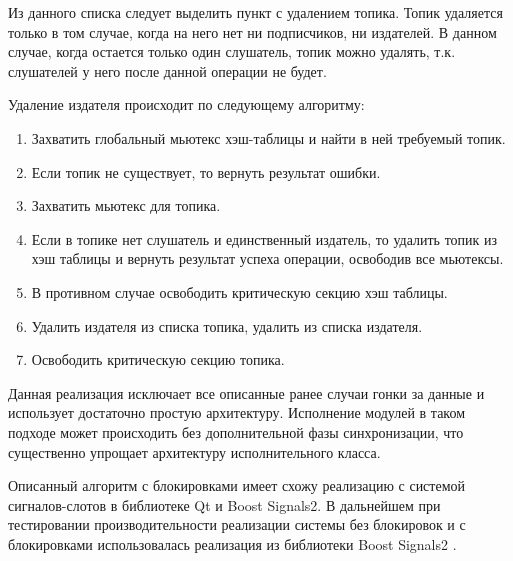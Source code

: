 Из данного списка следует выделить пункт с удалением топика. Топик удаляется только в том случае, когда на него нет ни подписчиков, ни издателей. В данном случае, когда остается только один слушатель, топик можно удалять, т.к. слушателей у него после данной операции не будет.

Удаление издателя происходит по следующему алгоритму:

\begin{enumerate}
	\item Захватить глобальный мьютекс хэш-таблицы и найти в ней требуемый топик.
	\item Если топик не существует, то вернуть результат ошибки.
	\item Захватить мьютекс для топика.
	\item Если в топике нет слушатель и единственный издатель, то удалить топик из хэш таблицы и вернуть результат успеха операции, освободив все мьютексы.
	\item В противном случае освободить критическую секцию хэш таблицы.
	\item Удалить издателя из списка топика, удалить из списка издателя.
	\item Освободить критическую секцию топика.
\end{enumerate}

Данная реализация исключает все описанные ранее случаи гонки за данные и использует достаточно простую архитектуру. Исполнение модулей в таком подходе может происходить без дополнительной фазы синхронизации, что существенно упрощает архитектуру исполнительного класса.

Описанный алгоритм с блокировками имеет схожу реализацию с системой сигналов-слотов в библиотеке Qt и Boost Signals2. В дальнейшем при тестировании производительности реализации системы без блокировок и с блокировками использовалась реализация из библиотеки Boost Signals2 \cite{schaling2011boost}.

